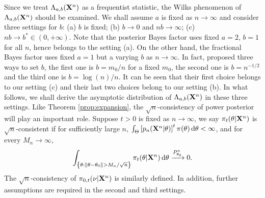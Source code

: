 \documentclass[11pt]{article}
\theoremstyle{plain}
\theoremstyle{definition}
\theoremstyle{remark}
\begin{document}
    Since we treat $\Lambda_{a,b}(\mathbf{X}^n)$ as a frequentist statistic,
    the Wilks phenomenon of $\Lambda_{a,b}(\mathbf{X}^n)$ should be examined.
    We shall assume $a$ is fixed as $n \to \infty$ and consider three settings for $b$: (a)
            $b$ is fixed;
            (b)
            $b \to 0$ and $n b \to \infty$;
            (c)
    $n b \to b^* \in (0, +\infty) $.
    Note that the posterior Bayes factor uses fixed $a=2$, $b=1$ for all $n$, hence belongs to the setting (a).
    On the other hand, the fractional Bayes factor uses fixed $a=1$ but a varying $b$ as $n \to \infty$.
    In fact, \cite{Fractional1995} proposed three ways to set $b$, the first one is $b=m_0/n$ for a fixed $m_0$, the second one is $b=n^{-1/2}$ and the third one is $b=\log ( n) /n$.
    It can be seen that their first choice belongs to our setting (c) and their last two choices belong to our setting (b).
    In what follows, we shall derive the asymptotic distribution of $\Lambda_{a,b}(\mathbf{X}^n)$ in these three settings.
Like Theorem \ref{prop:expansion}, the $\sqrt{n}$-consistency of power posterior will play an important role.
Suppose $t>0$ is fixed as $n \to \infty$, 
we say $\pi_t(\theta | \mathbf{X}^n)$ is $\sqrt n$-consistent if for sufficiently large $n$, $\int_{\Theta} \left[ p_n (\mathbf{X}^n | \theta) \right]^t \pi (\theta) \, \mathrm d \theta < \infty$, and for every $M_n \to \infty$,
\begin{align*}
\int_{ \left\{ \theta: \|\theta - \theta_0\| > M_n / \sqrt n \right\}}\pi_t(\theta | \mathbf{X}^n) \, \mathrm d \theta \xrightarrow{P_{\theta_0}^n} 0.
\end{align*}
The $\sqrt n$-consistency of $\pi_{0,t}(\nu | \mathbf{X}^n)$ is similarly defined.
In addition, further assumptions are required in the second and third settings.
\end{document}
